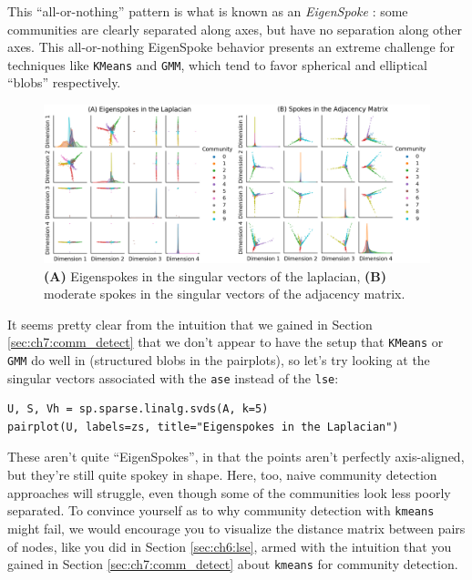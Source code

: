 This ``all-or-nothing'' pattern is what is known as an \textit{EigenSpoke} \cite{Prakash2010}: some communities are clearly separated along axes, but have no separation along other axes. This all-or-nothing EigenSpoke behavior presents an extreme challenge for techniques like \texttt{KMeans} and \texttt{GMM}, which tend to favor spherical and elliptical ``blobs'' respectively.

\begin{figure}[h]
    \centering
    \includegraphics[width=\linewidth]{applications/ch7/Images/eigenspokes.png}
    \caption[Spokes in spectral embeddings of sparse adjacency matrices]{\textbf{(A)} Eigenspokes in the singular vectors of the laplacian, \textbf{(B)} moderate spokes in the singular vectors of the adjacency matrix.}
    \label{fig:ch7:density:pair}
\end{figure}

It seems pretty clear from the intuition that we gained in Section \ref{sec:ch7:comm_detect} that we don't appear to have the setup that \texttt{KMeans} or \texttt{GMM} do well in (structured blobs in the pairplots), so let's try looking at the singular vectors associated with the \texttt{ase} instead of the \texttt{lse}:

\begin{lstlisting}[style=python]
U, S, Vh = sp.sparse.linalg.svds(A, k=5)
pairplot(U, labels=zs, title="Eigenspokes in the Laplacian")
\end{lstlisting}

These aren't quite ``EigenSpokes'', in that the points aren't perfectly axis-aligned, but they're still quite spokey in shape. Here, too, naive community detection approaches will struggle, even though some of the communities look less poorly separated. To convince yourself as to why community detection with \texttt{kmeans} might fail, we would encourage you to visualize the distance matrix between pairs of nodes, like you did in Section \ref{sec:ch6:lse}, armed with the intuition that you gained in Section \ref{sec:ch7:comm_detect} about \texttt{kmeans} for community detection.

